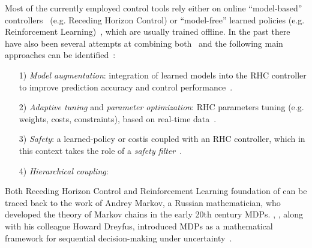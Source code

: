 Most of the currently employed control tools rely either on online ``model-based'' controllers~\cite{modern_mpc:neunert2018whole,web::atlas_grip_boston_dyn} (e.g. Receding Horizon Control) or ``model-free'' learned policies (e.g. Reinforcement Learning)~\cite{mpc_learn:aswani2012provably, mpc_learn:terzi2018learning, mpc_learn:soloperto2018learning, rl:schneider2023learning, rl:miki2024learning,mpc_learn:berkenkamp2016safe,mpc_learn:marco2016automatic,mpc_learn:brunner2015stabilizing,mpc_learn:rosolia2019learning,mpc_learn:englert2017inverse,mpc_learn:koller2018learning,mpc_learn:wabersich2021probabilistic,mpc_learn:gillulay2011guaranteed,mpc_learn:wabersich2018safe,mpc_learn:berkenkamp2017safe}, which are usually trained offline. In the past there have also been several attempts at combining both~\cite{mpc_learn:tsounis2020deepgait,mpc_learn:gangapurwala2021real} and the following main approaches can be identified~\cite{mpc_learn:hewing2020learning}:
\begin{itemize}
\item[1)] \textit{Model augmentation}: integration of learned models into the RHC controller to improve prediction accuracy and control performance~\cite{mpc_learn:aswani2012provably,mpc_learn:terzi2018learning,mpc_learn:soloperto2018learning}.
\item[2)] \textit{Adaptive tuning} and \textit{parameter optimization}: RHC parameters tuning (e.g. weights, costs, constraints), based on real-time data~\cite{mpc_learn:berkenkamp2016safe,mpc_learn:marco2016automatic,mpc_learn:brunner2015stabilizing,mpc_learn:rosolia2019learning,mpc_learn:englert2017inverse}.
\item[3)] \textit{Safety}: a learned-policy or costis coupled with an RHC controller, which in this context takes the role of a \textit{safety filter}~\cite{mpc_learn:koller2018learning,mpc_learn:wabersich2021probabilistic,mpc_learn:gillulay2011guaranteed,mpc_learn:wabersich2018safe,mpc_learn:berkenkamp2017safe}.
\item[4)] \textit{Hierarchical coupling}:
\end{itemize}
Both Receding Horizon Control and Reinforcement Learning 
foundation of  can be traced back to the work of Andrey Markov, a Russian mathematician, who developed the theory of Markov chains in the early 20th century
MDPs. , , along with his colleague Howard Dreyfus, introduced MDPs as a mathematical framework for sequential decision-making under uncertainty~\cite{rl:bellman1957markovian}.
